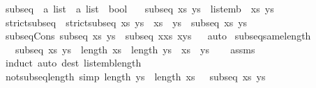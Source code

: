 \begin{isabellebody}
%
\endisadelimproof
%
\isadelimdocument
%
\endisadelimdocument
%
\isatagdocument
%
\isamarkuptrue%
%
\endisatagdocument
{\isafolddocument}%
%
\isadelimdocument
%
\endisadelimdocument
{}\isamarkupfalse%
\ subseq\ {\isacharcolon}{\isacharcolon}\ {\isachardoublequoteopen}{\isacharprime}a\ list\ {\isasymRightarrow}\ {\isacharprime}a\ list\ {\isasymRightarrow}\ bool{\isachardoublequoteclose}\isanewline
\ \ \ {\isachardoublequoteopen}subseq\ xs\ ys\ {\isasymequiv}\ list{\isacharunderscore}emb\ {\isacharparenleft}{\isacharequal}{\isacharparenright}\ xs\ ys{\isachardoublequoteclose}\isanewline
\ \ \isanewline
{}\isamarkupfalse%
\ strict{\isacharunderscore}subseq\ \ {\isachardoublequoteopen}strict{\isacharunderscore}subseq\ xs\ ys\ {\isasymlongleftrightarrow}\ xs\ {\isasymnoteq}\ ys\ {\isasymand}\ subseq\ xs\ ys{\isachardoublequoteclose}\isanewline
\isanewline
{}\isamarkupfalse%
\ subseq{\isacharunderscore}Cons{}{\isacharcolon}\ {\isachardoublequoteopen}subseq\ xs\ ys\ {\isasymLongrightarrow}\ subseq\ {\isacharparenleft}x{\isacharhash}xs{\isacharparenright}\ {\isacharparenleft}x{\isacharhash}ys{\isacharparenright}{\isachardoublequoteclose}%
\isadelimproof
\ %
\endisadelimproof
%
\isatagproof
{}\isamarkupfalse%
\ auto%
\endisatagproof
{\isafoldproof}%
%
\isadelimproof
%
\endisadelimproof
\isanewline
\isanewline
{}\isamarkupfalse%
\ subseq{\isacharunderscore}same{\isacharunderscore}length{\isacharcolon}\isanewline
\ \ \ {\isachardoublequoteopen}subseq\ xs\ ys{\isachardoublequoteclose}\ \ {\isachardoublequoteopen}length\ xs\ {\isacharequal}\ length\ ys{\isachardoublequoteclose}\ \ {\isachardoublequoteopen}xs\ {\isacharequal}\ ys{\isachardoublequoteclose}\isanewline
%
\isadelimproof
\ \ %
\endisadelimproof
%
\isatagproof
{}\isamarkupfalse%
\ assms\ \isamarkupfalse%
\ {\isacharparenleft}induct{\isacharparenright}\ {\isacharparenleft}auto\ dest{\isacharcolon}\ list{\isacharunderscore}emb{\isacharunderscore}length{\isacharparenright}%
\endisatagproof
{\isafoldproof}%
%
\isadelimproof
\isanewline
%
\endisadelimproof
\isanewline
{}\isamarkupfalse%
\ not{\isacharunderscore}subseq{\isacharunderscore}length\ {\isacharbrackleft}simp{\isacharbrackright}{\isacharcolon}\ {\isachardoublequoteopen}length\ ys\ {\isacharless}\ length\ xs\ {\isasymLongrightarrow}\ {\isasymnot}\ subseq\ xs\ ys{\isachardoublequoteclose}\isanewline

\end{isabellebody}
